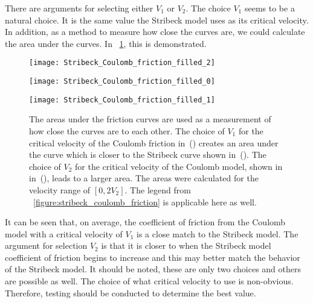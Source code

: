 There are arguments for selecting either $V_1$ or $V_2$.  The choice $V_1$ seems to be a natural choice.  It is the same value the Stribeck model uses as its critical velocity.  In addition, as a method to measure how close the curves are, we could calculate the area under the curves.  In \figurename~\ref{fig:frictionmodelareaundercurves}, this is demonstrated.
\begin{figure}
	\begin{minipage}[t]{\linewidth}
			\begin{minipage}[t]{0.325\linewidth}
				\centering
				\texttt{[image: Stribeck\_Coulomb\_friction\_filled\_2]}
				\label{fig:Stribeck_Coulomb_friction_filled_2}
			\end{minipage}
			\hfill
			\begin{minipage}[t]{0.325\linewidth}
				\centering
				\texttt{[image: Stribeck\_Coulomb\_friction\_filled\_0]}
				\label{fig:Stribeck_Coulomb_friction_filled_0}
			\end{minipage}
			\hfill
			\begin{minipage}[t]{0.325\linewidth}
				\centering
				\texttt{[image: Stribeck\_Coulomb\_friction\_filled\_1]}
				\label{fig:Stribeck_Coulomb_friction_filled_1}
			\end{minipage}
	\end{minipage}
    \caption[Areas under friction curves]{The areas under the friction curves are used as a measurement of how close the curves are to each other.  The choice of $V_1$ for the critical velocity of the Coulomb friction in~() creates an area under the curve which is closer to the Stribeck curve shown in~().  The choice of $V_2$ for the critical velocity of the Coulomb model, shown in in~(), leads to a larger area.  The areas were calculated for the velocity range of $[0, 2V_2]$.  The legend from \figurename~\ref{figure:stribeck_coulomb_friction} is applicable here as well.}
	\label{fig:frictionmodelareaundercurves}
\end{figure}
It can be seen that, on average, the coefficient of friction from the Coulomb model with a critical velocity of $V_1$ is a close match to the Stribeck model.  The argument for selection $V_2$ is that it is closer to when the Stribeck model coefficient of friction begins to increase and this may better match the behavior of the Stribeck model.  It should be noted, these are only two choices and others are possible as well.  The choice of what critical velocity to use is non-obvious.  Therefore, testing should be conducted to determine the best value.

